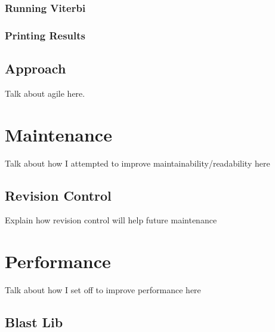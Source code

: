 \subsection{Running Viterbi}
\subsection{Printing Results}


\section{Approach}
Talk about agile here.

\chapter{Maintenance}
Talk about how I attempted to improve maintainability/readability here

\section{Revision Control}
Explain how revision control will help future maintenance 

\chapter{Performance}
Talk about how I set off to improve performance here

\section{Blast Lib}
